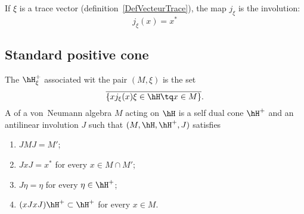 If $\xi$ is a trace vector (definition~\ref{DefVecteurTrace}), the map $j_{\xi}$ is the involution:
\begin{equation}
	j_{\xi}(x)=x^*
\end{equation}

\subsection{Standard positive cone}

The  $\hH_{\xi}^+$ associated wit the pair $(M,\xi)$ is the set
\begin{equation}
	\overline{ \{ xj_{\xi}(x)\xi\in\hH\tq x\in M \} }.
\end{equation}
A  of a von~Neumann algebra $M$ acting on $\hH$ is a self dual cone $\hH^+$ and an antilinear involution $J$ such that $(M,\hH,\hH^+,J)$ satisfies
\begin{enumerate}
	\item
	      $JMJ=M'$;
	\item
	      $JxJ=x^*$ for every $x\in M\cap M'$;
	\item
	      $J\eta=\eta$ for every $\eta\in\hH^+$;
	\item
	      $(xJxJ)\hH^+\subset\hH^+$ for every $x\in M$.
\end{enumerate}


\label{LaFin}
